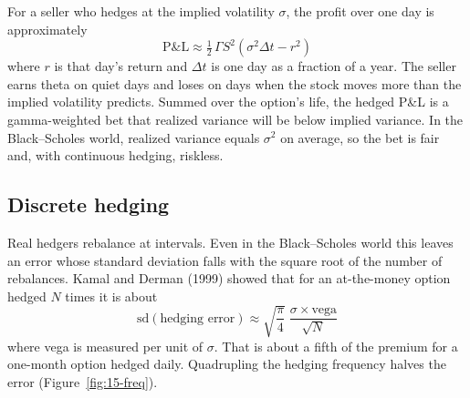 For a seller who hedges at the implied volatility $\sigma$, the profit over one day is approximately
\begin{equation}
  \text{P\&L} \approx \tfrac{1}{2}\,\Gamma S^2 \left(\sigma^2 \Delta t - r^2\right)
  \label{eq:15-pnl}
\end{equation}
where $r$ is that day's return and $\Delta t$ is one day as a fraction of a year. The seller earns theta on quiet days and loses on days when the stock moves more than the implied volatility predicts. Summed over the option's life, the hedged P\&L is a gamma-weighted bet that realized variance will be below implied variance. In the Black--Scholes world, realized variance equals $\sigma^2$ on average, so the bet is fair and, with continuous hedging, riskless.

\subsection{Discrete hedging}

Real hedgers rebalance at intervals. Even in the Black--Scholes world this leaves an error whose standard deviation falls with the square root of the number of rebalances. Kamal and Derman (1999) showed that for an at-the-money option hedged $N$ times it is about
\begin{equation}
  \mathrm{sd}(\text{hedging error}) \approx \sqrt{\frac{\pi}{4}}\;\frac{\sigma \times \text{vega}}{\sqrt{N}}
  \label{eq:15-kd}
\end{equation}
where vega is measured per unit of $\sigma$. That is about a fifth of the premium for a one-month option hedged daily. Quadrupling the hedging frequency halves the error (Figure~\ref{fig:15-freq}).

